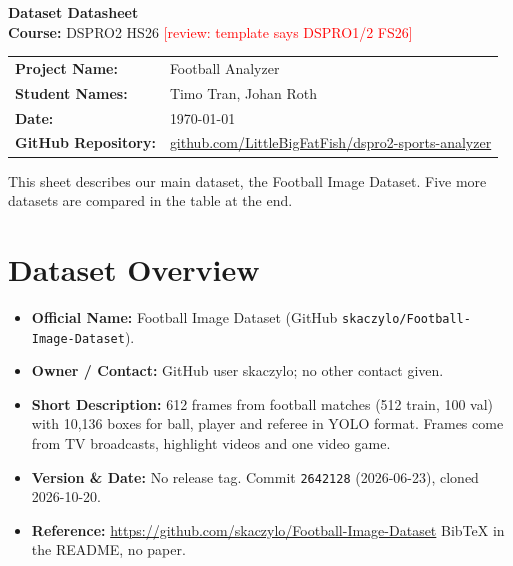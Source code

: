 \documentclass[11pt, a4paper]{article}
\newcommand{\review}[1]{\textcolor{red}{[review: #1]}}
\begin{document}
\begin{center}
    {\huge \bfseries \color{primaryBlue} Dataset Datasheet} \\[0.2cm]
    {\large \textbf{Course:} DSPRO2 HS26 \review{template says DSPRO1/2 FS26}} \\[0.1cm]
\end{center}

\vspace{0.4cm}

\begin{studentbox}
    \begin{tabularx}{\textwidth}{l X}
        \textbf{Project Name:} & Football Analyzer \\
        \textbf{Student Names:} & Timo Tran, Johan Roth \\
        \textbf{Date:} & \today \\
        \textbf{GitHub Repository:} & \url{github.com/LittleBigFatFish/dspro2-sports-analyzer} \\
    \end{tabularx}
\end{studentbox}

\vspace{0.3cm}

\noindent This sheet describes our main dataset, the Football Image Dataset. Five more datasets are compared in the table at the end.

\section{Dataset Overview}
\begin{itemize}
    \item \textbf{Official Name:} Football Image Dataset (GitHub \texttt{skaczylo/Football-Image-Dataset}).
    \item \textbf{Owner / Contact:} GitHub user skaczylo; no other contact given.
    \item \textbf{Short Description:} 612 frames from football matches (512 train, 100 val) with 10,136 boxes for ball, player and referee in YOLO format. Frames come from TV broadcasts, highlight videos and one video game.
    \item \textbf{Version \& Date:} No release tag. Commit \texttt{2642128} (2026-06-23), cloned 2026-10-20.
    \item \textbf{Reference:} \url{https://github.com/skaczylo/Football-Image-Dataset} \newline BibTeX in the README, no paper.
\end{itemize}
\end{document}
